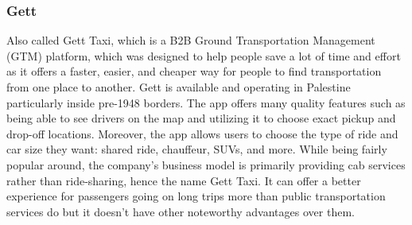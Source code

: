 \documentclass[a4paper, 12pt]{article} %
\begin{document}
            \subsubsection{Gett}
                Also called Gett Taxi, which is a B2B Ground Transportation Management (GTM) platform, which was designed to help people save a lot of time and effort as it offers a faster, easier, and cheaper way for people to find transportation from one place to another. \cite{gett_wiki,gett_news} Gett is available and operating in Palestine particularly inside pre-1948 borders. The app offers many quality features such as being able to see drivers on the map and utilizing it to choose exact pickup and drop-off locations. Moreover, the app allows users to choose the type of ride and car size they want: shared ride, chauffeur, SUVs, and more. While being fairly popular around, the company's business model is primarily providing cab services rather than ride-sharing, hence the name Gett Taxi. It can offer a better experience for passengers going on long trips more than public transportation services do but it doesn't have other noteworthy advantages over them. 
\end{document}
